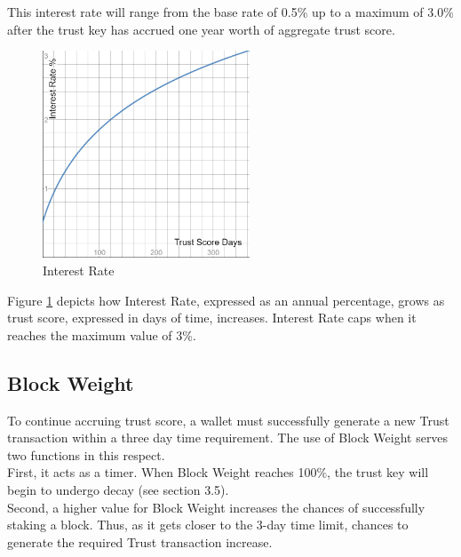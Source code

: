 \documentclass[11pt]{article}
\begin{document}
\noindent This interest rate will range from the base rate of 0.5\% up to a maximum of 3.0\% after the trust key has accrued one year worth of aggregate trust score. \\

\begin{figure}[h!]
    \centering
    \includegraphics[width=0.55\textwidth]{images/interestRate.png}
    \caption{Interest Rate \label{fig:interestRate}}
\end{figure}

\noindent Figure \ref{fig:interestRate} depicts how Interest Rate, expressed as an annual percentage, grows as trust score, expressed in days of time, increases. Interest Rate caps when it reaches the maximum value of 3\%.\\

\subsection{Block Weight}
To continue accruing trust score, a wallet must successfully generate a new Trust transaction within a three day time requirement. The use of Block Weight serves two functions in this respect.\\

\noindent First, it acts as a timer. When Block Weight reaches 100\%, the trust key will begin to undergo decay (see section 3.5).\\

\noindent Second, a higher value for Block Weight increases the chances of successfully staking a block. Thus, as it gets closer to the 3-day time limit, chances to generate the required Trust transaction increase.\\
\end{document}
